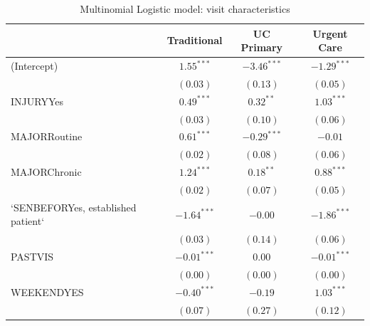 \documentclass[12pt,twoside]{reedthesis}
\begin{document}
  \begin{table}
  \caption{Multinomial Logistic model: visit characteristics}
  \begin{center}
  \begin{footnotesize}
  \begin{tabular}{l@{} c@{} c@{} c@{} }
  \toprule
   & Traditional & UC Primary & Urgent Care \\
  \midrule
  (Intercept)                        & $\mathbf{1.55}^{***}$  & $\mathbf{-3.46}^{***}$ & $\mathbf{-1.29}^{***}$ \\
                                     & $(0.03)$               & $(0.13)$               & $(0.05)$               \\
  INJURYYes                          & $\mathbf{0.49}^{***}$  & $0.32^{**}$            & $\mathbf{1.03}^{***}$  \\
                                     & $(0.03)$               & $(0.10)$               & $(0.06)$               \\
  MAJORRoutine                       & $\mathbf{0.61}^{***}$  & $\mathbf{-0.29}^{***}$ & $-0.01$                \\
                                     & $(0.02)$               & $(0.08)$               & $(0.06)$               \\
  MAJORChronic                       & $\mathbf{1.24}^{***}$  & $0.18^{**}$            & $\mathbf{0.88}^{***}$  \\
                                     & $(0.02)$               & $(0.07)$               & $(0.05)$               \\
  `SENBEFORYes, established patient` & $\mathbf{-1.64}^{***}$ & $-0.00$                & $\mathbf{-1.86}^{***}$ \\
                                     & $(0.03)$               & $(0.14)$               & $(0.06)$               \\
  PASTVIS                            & $\mathbf{-0.01}^{***}$ & $0.00$                 & $\mathbf{-0.01}^{***}$ \\
                                     & $(0.00)$               & $(0.00)$               & $(0.00)$               \\
  WEEKENDYES                         & $\mathbf{-0.40}^{***}$ & $-0.19$                & $\mathbf{1.03}^{***}$  \\
                                     & $(0.07)$               & $(0.27)$               & $(0.12)$               \\
  \midrule

\end{tabular}
\end{footnotesize}
\end{center}
\end{table}
\end{document}
